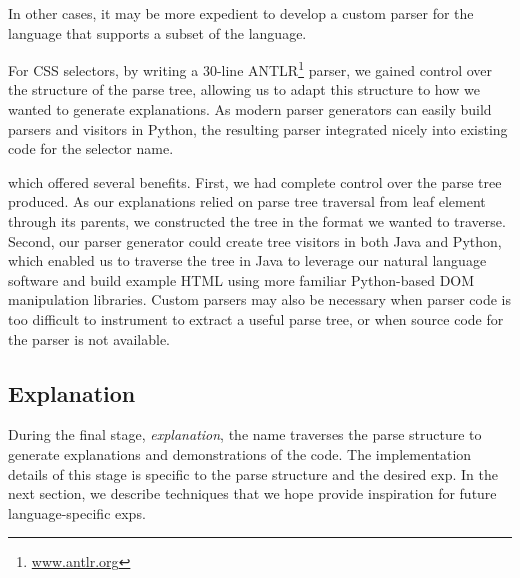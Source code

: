 In other cases, it may be more expedient to develop a custom parser for the language that supports a subset of the language.
\begin{changes}
For CSS selectors, by writing a 30-line ANTLR\footnote{\url{www.antlr.org}} parser, we gained control over the structure of the parse tree, allowing us to adapt this structure to how we wanted to generate explanations.
As modern parser generators can easily build parsers and visitors in Python, the resulting parser integrated nicely into existing code for the selector \gls{name}.
\end{changes}
which offered several benefits.
First, we had complete control over the parse tree produced.
As our explanations relied on parse tree traversal from leaf element through its parents, we constructed the tree in the format we wanted to traverse.
Second, our parser generator could create tree visitors in both Java and Python, which enabled us to traverse the tree in Java to leverage our natural language software and build example HTML using more familiar Python-based DOM manipulation libraries.
Custom parsers may also be necessary when parser code is too difficult to instrument to extract a useful parse tree, or when source code for the parser is not available.
\fi

\subsection{Explanation}

During the final stage, \emph{explanation}, the \gls{name} traverses the parse structure to generate explanations and demonstrations of the code.
The implementation details of this stage is specific to the parse structure and the desired \gls{exp}.
In the next section, we describe techniques that we hope provide inspiration for future language-specific \glspl{exp}.
